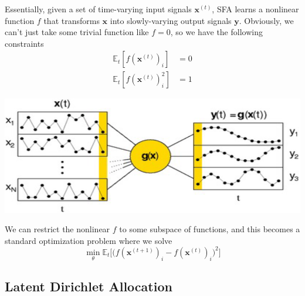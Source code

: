   Essentially, given a set of time-varying input signals $\mathbf{x}^{(t)}$, SFA learns a nonlinear function $f$ that transforms $\mathbf{x}$ into slowly-varying output signals $\mathbf{y}$. Obviously, we can't just take some trivial function like $f = 0$, so we have the following constraints 
  \begin{align}
    \mathbb{E}_t [ f(\mathbf{x}^{(t)})_i]  & = 0 \\ 
    \mathbb{E}_t [ f(\mathbf{x}^{(t)})_i^2] & = 1 
  \end{align}
  \begin{center} 
    \includegraphics[scale=0.4]{img/slow_feature.png}
  \end{center}
  We can restrict the nonlinear $f$ to some subspace of functions, and this becomes a standard optimization problem where we solve 
  \begin{equation}
    \min_\theta \mathbb{E}_t \big[ \big( f(\mathbf{x}^{(t+1)})_i - f(\mathbf{x}^{(t)})_i \big)^2 \big]
  \end{equation}

\subsection{Latent Dirichlet Allocation} 

